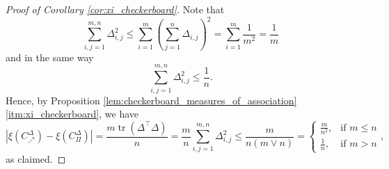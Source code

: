 \documentclass{article}
\theoremstyle{definition}
\DeclareMathOperator{\tr}{tr}  %
\def\abs#1{\left\lvert#1\right\rvert} %
\begin{document}
\begin{proof}[Proof of Corollary \ref{cor:xi_checkerboard}]
    Note that
    \[
        \sum_{i,j=1}^{m,n} \Delta_{i,j}^2
        \leq \sum_{i=1}^m \left(\sum_{j=1}^n \Delta_{i,j}\right)^2
        = \sum_{i=1}^m\frac1{m^2}
        = \frac{1}{m}
    \]
    and in the same way
    \[
        \sum_{i,j=1}^{m,n} \Delta_{i,j}^2 \leq \frac{1}{n}
    .\]
    Hence, by Proposition \ref{lem:checkerboard_measures_of_association} \ref{itm:xi_checkerboard}, we have
    \[
        \abs{\xi\left(C^\Delta_{\nearrow}\right) 
        - \xi\left(C^\Delta_{\Pi}\right)}
        = \frac{m\tr(\Delta^\top \Delta)}{n}
        = \frac{m}{n}\sum_{i,j=1}^{m,n} \Delta_{i,j}^2
        \le \frac{m}{n(m\vee n)}
        = \begin{cases}
            \frac{m}{n^2}, & \text{if } m\le n \\
            \frac{1}{n}, & \text{if } m > n
        \end{cases}
    ,\]
    as claimed.
\end{proof}

{}

\end{document}
